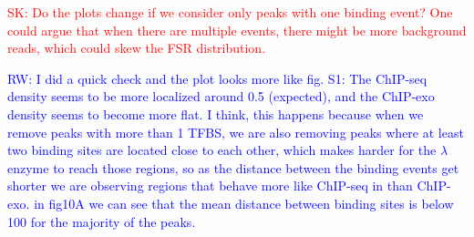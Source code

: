 \documentclass{bmcart}
\newcommand{\SK}[1]{\textcolor{red}{SK: #1}}
\newcommand{\RW}[1]{\textcolor{blue}{RW: #1}}
\begin{document}

\SK{Do the plots change if we consider only peaks with one binding
  event? One could argue that when there are multiple events, there
  might be more background reads, which could skew the FSR
  distribution.}

\RW{I did a quick check and the plot looks more like fig. S1: The
  ChIP-seq density seems to be more localized around 0.5 (expected),
  and the ChIP-exo density seems to become more flat. I think, this
  happens because when we remove peaks with more than 1 TFBS, we are
  also removing peaks where at least two binding sites are located
  close to each other, which makes harder for the $\lambda$ enzyme to
  reach those regions, so as the distance between the binding events
  get shorter we are observing regions that behave more like ChIP-seq
  in than ChIP-exo. in fig10A we can see that the mean distance
  between binding sites is below 100 for the majority of the peaks.}




\end{document}
